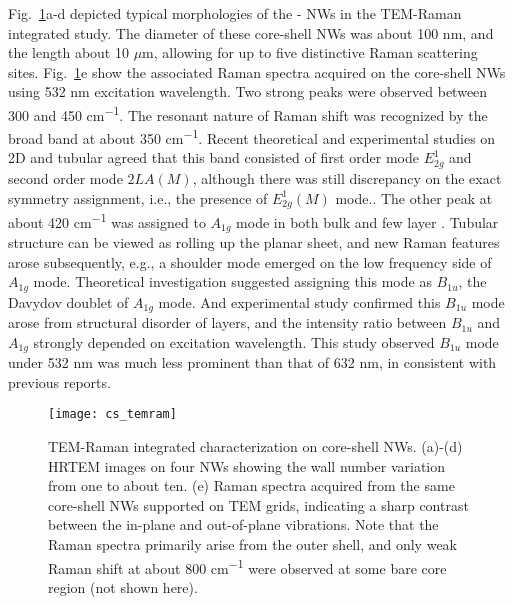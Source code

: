 Fig.~\ref{fig:ch5ws2ram}a-d depicted typical morphologies of the - NWs in the TEM-Raman integrated study. The diameter of these core-shell NWs was about 100 nm, and the length about 10 $\mu$m, allowing for up to five distinctive Raman scattering sites. Fig.~\ref{fig:ch5ws2ram}e show the associated Raman spectra acquired on the core-shell NWs using 532 nm excitation wavelength. Two strong peaks were observed between 300 and 450 \si{cm^{-1}}. The resonant nature\cite{Stacy1985} of Raman shift was recognized by the broad band at about 350 \si{cm^{-1}}.  Recent theoretical\cite{Molina-Sanchez2011} and experimental\cite{Staiger2012} studies on 2D and tubular  agreed that this band consisted of first order mode $E_{2g}^1$ and second order mode $2LA(M)$, although there was still discrepancy on the exact symmetry assignment, i.e., the presence of $E_{2g}^1(M)$ mode.\cite{Berkdemir2013,Peimyoo2013}. The other peak at about 420 \si{cm^{-1}} was assigned to $A_{1g}$ mode in both bulk\cite{Sekine1980} and few layer . Tubular  structure can be viewed as rolling up the planar  sheet, and new Raman features arose subsequently, e.g., a shoulder mode emerged on the low frequency side of $A_{1g}$ mode. Theoretical investigation suggested assigning this mode as $B_{1u}$, the Davydov doublet of $A_{1g}$ mode.\cite{Ataca2012} And experimental study confirmed this $B_{1u}$ mode arose from structural disorder of  layers, and the intensity ratio between $B_{1u}$ and $A_{1g}$ strongly depended on excitation wavelength.\cite{Staiger2012} This study observed $B_{1u}$ mode under 532 nm was much less prominent than that of 632 nm, in consistent with previous reports.\cite{Krause2009,Krause2009a} 
\begin{figure}[htb]
\centering
\texttt{[image: cs\_temram]}
\caption[TEM-Raman integrated characterization on core-shell NWs]{TEM-Raman integrated characterization on core-shell NWs. (a)-(d) HRTEM images on four NWs showing the  wall number variation from one to about ten. (e) Raman spectra acquired from the same core-shell NWs supported on TEM grids, indicating a sharp contrast between the in-plane and out-of-plane vibrations. Note that the Raman spectra primarily arise from the outer  shell, and only weak Raman shift at about 800 \si{cm^{-1}} were observed at some bare core region (not shown here).}
\label{fig:ch5ws2ram}
\end{figure}

